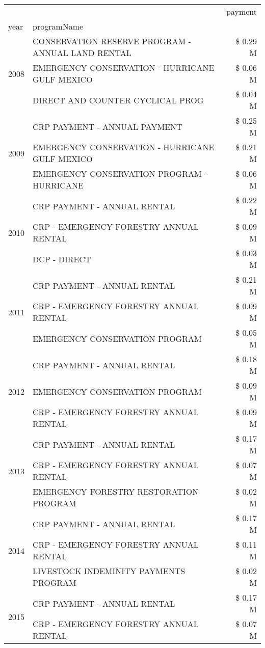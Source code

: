 \begin{tabular}{llr}
\toprule
 &  & payment \\
year & programName &  \\
\midrule
\multirow[t]{3}{*}{2008} & CONSERVATION RESERVE PROGRAM - ANNUAL LAND RENTAL & \$ 0.29 M \\
 & EMERGENCY CONSERVATION - HURRICANE GULF MEXICO & \$ 0.06 M \\
 & DIRECT AND COUNTER CYCLICAL PROG & \$ 0.04 M \\
\cline{1-3}
\multirow[t]{3}{*}{2009} & CRP PAYMENT - ANNUAL PAYMENT & \$ 0.25 M \\
 & EMERGENCY CONSERVATION - HURRICANE GULF MEXICO & \$ 0.21 M \\
 & EMERGENCY CONSERVATION PROGRAM - HURRICANE & \$ 0.06 M \\
\cline{1-3}
\multirow[t]{3}{*}{2010} & CRP PAYMENT - ANNUAL RENTAL & \$ 0.22 M \\
 & CRP - EMERGENCY FORESTRY ANNUAL RENTAL & \$ 0.09 M \\
 & DCP - DIRECT & \$ 0.03 M \\
\cline{1-3}
\multirow[t]{3}{*}{2011} & CRP PAYMENT - ANNUAL RENTAL & \$ 0.21 M \\
 & CRP - EMERGENCY FORESTRY ANNUAL RENTAL & \$ 0.09 M \\
 & EMERGENCY CONSERVATION PROGRAM & \$ 0.05 M \\
\cline{1-3}
\multirow[t]{3}{*}{2012} & CRP PAYMENT - ANNUAL RENTAL & \$ 0.18 M \\
 & EMERGENCY CONSERVATION PROGRAM & \$ 0.09 M \\
 & CRP - EMERGENCY FORESTRY ANNUAL RENTAL & \$ 0.09 M \\
\cline{1-3}
\multirow[t]{3}{*}{2013} & CRP PAYMENT - ANNUAL RENTAL & \$ 0.17 M \\
 & CRP - EMERGENCY FORESTRY ANNUAL RENTAL & \$ 0.07 M \\
 & EMERGENCY FORESTRY RESTORATION PROGRAM & \$ 0.02 M \\
\cline{1-3}
\multirow[t]{3}{*}{2014} & CRP PAYMENT - ANNUAL RENTAL & \$ 0.17 M \\
 & CRP - EMERGENCY FORESTRY ANNUAL RENTAL & \$ 0.11 M \\
 & LIVESTOCK INDEMINITY PAYMENTS PROGRAM & \$ 0.02 M \\
\cline{1-3}
\multirow[t]{2}{*}{2015} & CRP PAYMENT - ANNUAL RENTAL & \$ 0.17 M \\
 & CRP - EMERGENCY FORESTRY ANNUAL RENTAL & \$ 0.07 M \\

\end{tabular}
